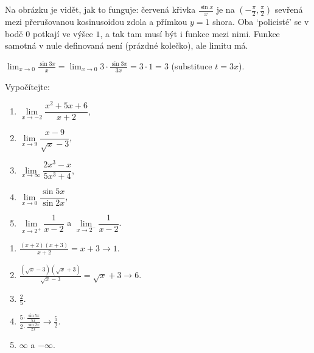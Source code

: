 \begin{center}
\end{center}
Na obrázku je vidět, jak to funguje: červená křivka $\frac{\sin x}{x}$ je na $\left(-\frac{\pi}{2}, \frac{\pi}{2}\right)$ sevřená mezi přerušovanou kosinusoidou zdola a přímkou $y = 1$ shora. Oba `policisté' se v bodě $0$ potkají ve výšce $1$, a tak tam musí být i funkce mezi nimi. Funkce samotná v nule definovaná není (prázdné kolečko), ale limitu má.

\begin{example}
  $\lim_{x\to 0}\frac{\sin 3x}{x} = \lim_{x\to 0} 3\cdot\frac{\sin 3x}{3x} = 3\cdot 1 = 3$ (substituce $t = 3x$).
\end{example}

\begin{problem}
  Vypočítejte:
  \begin{enumerate}[label=(\alph*)]
    \item $\lim\limits_{x\to -2}\dfrac{x^2 + 5x + 6}{x + 2}$,
    \item $\lim\limits_{x\to 9}\dfrac{x - 9}{\sqrt{x} - 3}$,
    \item $\lim\limits_{x\to\infty}\dfrac{2x^3 - x}{5x^3 + 4}$,
    \item $\lim\limits_{x\to 0}\dfrac{\sin 5x}{\sin 2x}$,
    \item $\lim\limits_{x\to 2^+}\dfrac{1}{x - 2}$ a $\lim\limits_{x\to 2^-}\dfrac{1}{x - 2}$.
  \end{enumerate}
\end{problem}

\begin{solution}
  \begin{enumerate}[label=(\alph*)]
    \item $\frac{(x + 2)(x + 3)}{x + 2} = x + 3\to 1$.
    \item $\frac{(\sqrt{x} - 3)(\sqrt{x} + 3)}{\sqrt{x} - 3} = \sqrt{x} + 3\to 6$.
    \item $\frac{2}{5}$.
    \item $\frac{5\cdot\frac{\sin 5x}{5x}}{2\cdot\frac{\sin 2x}{2x}}\to\frac{5}{2}$.
    \item $\infty$ a $-\infty$.
  \end{enumerate}
\end{solution}

